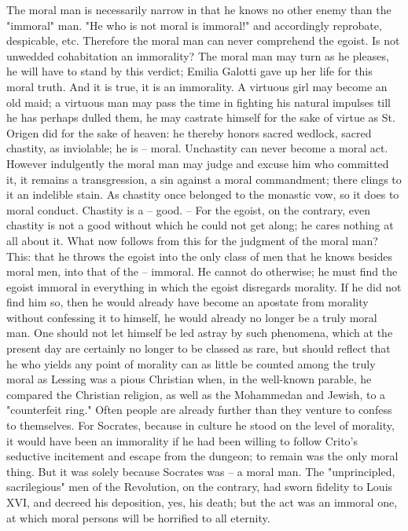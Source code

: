The moral man is necessarily narrow in that he knows no other enemy than the 
"{}immoral"{} man. "{}He who is not moral is immoral!"{} and accordingly 
reprobate, despicable, etc. Therefore the moral man can never comprehend the 
egoist. Is not unwedded cohabitation an immorality? The moral man may turn as 
he pleases, he will have to stand by this verdict; Emilia Galotti gave up her 
life for this moral truth. And it is true, it is an immorality. A virtuous 
girl may become an old maid; a virtuous man may pass the time in fighting his 
natural impulses till he has perhaps dulled them, he may castrate himself for 
the sake of virtue as St. Origen did for the sake of heaven: he thereby honors 
sacred wedlock, sacred chastity, as inviolable; he is -- moral. Unchastity can 
never become a moral act. However indulgently the moral man may judge and 
excuse him who committed it, it remains a transgression, a sin against a moral 
commandment; there clings to it an indelible stain. As chastity once belonged 
to the monastic vow, so it does to moral conduct. Chastity is a -- good. -- 
For the egoist, on the contrary, even chastity is not a good without which he 
could not get along; he cares nothing at all about it. What now follows from 
this for the judgment of the moral man? This: that he throws the egoist into 
the only class of men that he knows besides moral men, into that of the -- 
immoral. He cannot do otherwise; he must find the egoist immoral in everything 
in which the egoist disregards morality. If he did not find him so, then he 
would already have become an apostate from morality without confessing it to 
himself, he would already no longer be a truly moral man. One should not let 
himself be led astray by such phenomena, which at the present day are 
certainly no longer to be classed as rare, but should reflect that he who 
yields any point of morality can as little be counted among the truly moral as 
Lessing was a pious Christian when, in the well-known parable, he compared the 
Christian religion, as well as the Mohammedan and Jewish, to a "{}counterfeit 
ring."{} Often people are already further than they venture to confess to 
themselves. For Socrates, because in culture he stood on the level of 
morality, it would have been an immorality if he had been willing to follow 
Crito's seductive incitement and escape from the dungeon; to remain was the 
only moral thing. But it was solely because Socrates was -- a moral man. The 
"{}unprincipled, sacrilegious"{} men of the Revolution, on the contrary, had 
sworn fidelity to Louis XVI, and decreed his deposition, yes, his death; but 
the act was an immoral one, at which moral persons will be horrified to all 
eternity.

